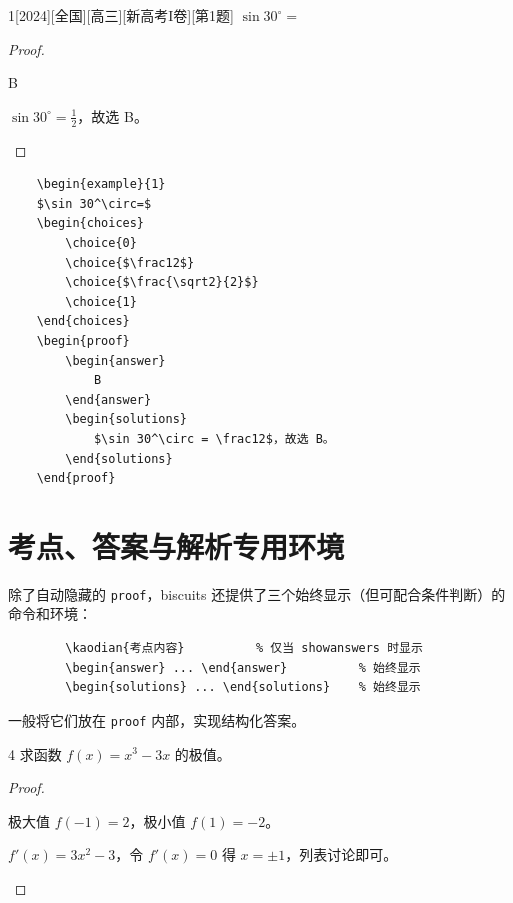 \documentclass[
showanswers,        %
answercolor=red,    %
numbercolor=blue,   %
paper=a3,           %
nojuemi,              %
nozhuyishixiang,      %
example,        %
]{biscuits}
\begin{document}
	\begin{example}{1}[2024][全国][高三][新高考I卷][第1题]
		$\sin 30^\circ=$
		\begin{choices}
			   
		\end{choices}
\begin{proof}
	\begin{answer}
 B		
\end{answer}		
\begin{solutions}
		$\sin 30^\circ = \frac12$，故选 B。
\end{solutions}	
\end{proof}		
	\end{example}
\begin{verbatim}
	\begin{example}{1}
	$\sin 30^\circ=$
	\begin{choices}
		\choice{0} 
		\choice{$\frac12$} 
		\choice{$\frac{\sqrt2}{2}$} 
		\choice{1}
	\end{choices}
	\begin{proof}
		\begin{answer}
			B		
		\end{answer}		
		\begin{solutions}
			$\sin 30^\circ = \frac12$，故选 B。
		\end{solutions}	
	\end{proof}			
\end{verbatim}	
	
	\section{考点、答案与解析专用环境}
	
	除了自动隐藏的 \texttt{proof}，biscuits 还提供了三个始终显示（但可配合条件判断）的命令和环境：
	
	\begin{verbatim}
		\kaodian{考点内容}          % 仅当 showanswers 时显示
		\begin{answer} ... \end{answer}          % 始终显示
		\begin{solutions} ... \end{solutions}    % 始终显示
	\end{verbatim}
	
	一般将它们放在 \texttt{proof} 内部，实现结构化答案。
	
	\begin{example}{4}
		求函数 $f(x)=x^3-3x$ 的极值。
	\end{example}
	\begin{proof}
		\begin{answer}
			极大值 $f(-1)=2$，极小值 $f(1)=-2$。
		\end{answer}
		\begin{solutions}
			$f'(x)=3x^2-3$，令 $f'(x)=0$ 得 $x=\pm1$，列表讨论即可。
		\end{solutions}
	\end{proof}
	
\end{document}
